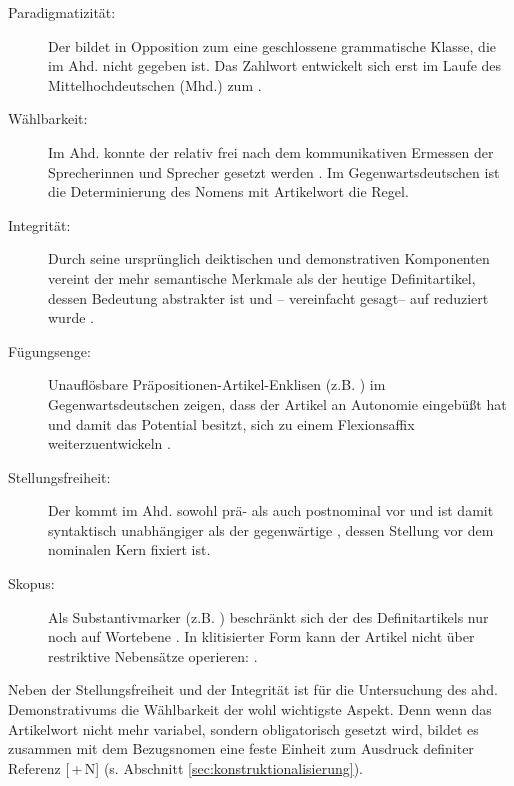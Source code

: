 \begin{description}
\item[Paradigmatizität:] Der  bildet in Opposition zum  eine geschlossene grammatische Klasse, die im Ahd. nicht gegeben ist. Das Zahlwort  entwickelt sich erst im Laufe des Mittelhochdeutschen (Mhd.) zum  \parencite{Szczepaniak2016}. 
\item[Wählbarkeit:] Im Ahd. konnte der  relativ frei nach dem kommunikativen Ermessen der Sprecherinnen und Sprecher gesetzt werden \parencite{Oubouzar1992}. Im Gegenwartsdeutschen ist die Determinierung des Nomens mit Artikelwort die Regel. 
\item[Integrität:] Durch seine ursprünglich deiktischen und demonstrativen Komponenten vereint der  mehr semantische Merkmale als der heutige Definitartikel, dessen Bedeutung abstrakter ist und -- vereinfacht gesagt-- auf  reduziert wurde \parencite[41]{Lehmann2015}.
\item[Fügungsenge:] Unauflösbare Präpositionen-Artikel-Enklisen (z.B. )  im Gegenwartsdeutschen zeigen, dass der Artikel an Autonomie eingebüßt hat und damit das Potential besitzt, sich zu einem Flexionsaffix  weiterzuentwickeln \parencite[s. hierzu][]{Nubling1992,Nubling2005}.  
\item[Stellungsfreiheit:] Der  kommt im Ahd. sowohl prä- als auch postnominal vor \parencite[27--28]{Schrodt2004} und ist damit syntaktisch unabhängiger als der gegenwärtige , dessen Stellung vor dem nominalen Kern fixiert ist. 
\item[Skopus:] Als Substantivmarker (z.B. ) beschränkt sich der  des Definitartikels nur noch auf Wortebene \parencite[71]{Szczepaniak2011a}. In klitisierter Form  kann der Artikel nicht über restriktive Nebensätze operieren:  \parencite[112]{Nubling2005}.
\end{description}

\noindent
Neben der Stellungsfreiheit  und der Integrität ist für die Untersuchung des ahd. Demonstrativums  die Wählbarkeit der wohl wichtigste Aspekt. Denn wenn das Artikelwort nicht mehr variabel, sondern obligatorisch gesetzt wird, bildet es zusammen mit dem Bezugsnomen eine feste Einheit zum Ausdruck definiter Referenz  [\,+\,N] (s. Abschnitt \ref{sec:konstruktionalisierung}). 

